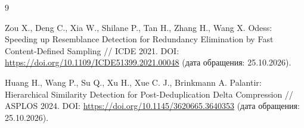\documentclass[a4paper]{article}
\begin{document}



\begin{thebibliography}{9}

Zou X., Deng C., Xia W., Shilane P., Tan H., Zhang H., Wang X.
Odess: Speeding up Resemblance Detection for Redundancy Elimination by Fast
Content-Defined Sampling // ICDE 2021.
DOI: \url{https://doi.org/10.1109/ICDE51399.2021.00048}
(дата обращения: 25.10.2026).

Huang H., Wang P., Su Q., Xu H., Xue C. J., Brinkmann A.
Palantir: Hierarchical Similarity Detection for Post-Deduplication Delta
Compression // ASPLOS 2024.
DOI: \url{https://doi.org/10.1145/3620665.3640353}
(дата обращения: 25.10.2026).

\end{thebibliography}
\end{document}

